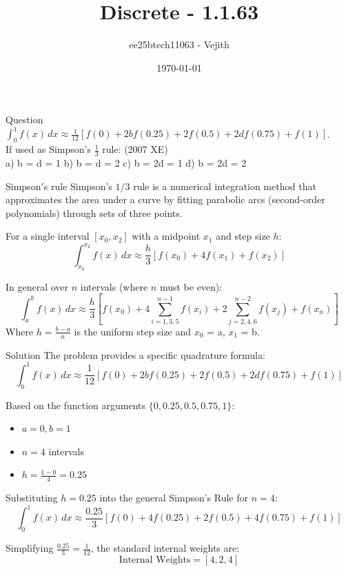 \documentclass{beamer}
\title{Discrete - 1.1.63}
\author{ee25btech11063 - Vejith}
\date{\today}
\begin{document}
\begin{frame}
\titlepage
\end{frame}

\begin{frame}{Question}
 $\int_{0}^{1} f(x) \, dx \approx \frac{1}{12} [f(0) + 2bf(0.25) + 2f(0.5) + 2df(0.75) + f(1)]$. \\
If used as Simpson's $\frac{1}{3}$ rule: \hfill (2007 XE) 
\noindent
\\ a) b = d = 1 \hfill b) b = d = 2 \hfill c) b = 2d = 1 \hfill d) b = 2d = 2
\end{frame}
\begin{frame}{Simpson$'$s rule}
    Simpson's $1/3$ rule is a numerical integration method that approximates the area under a curve by fitting parabolic arcs (second-order polynomials) through sets of three points. 

For a single interval $[x_0, x_2]$ with a midpoint $x_1$ and step size $h$:
\begin{equation}
\int_{x_0}^{x_2} f(x) \, dx \approx \frac{h}{3} \left[ f(x_0) + 4f(x_1) + f(x_2) \right]
\end{equation}

In general  over $n$ intervals (where $n$ must be even):
\begin{equation}
\int_{a}^{b} f(x) \, dx \approx \frac{h}{3} \left[ f(x_0) + 4 \sum_{i=1,3,5}^{n-1} f(x_i) + 2 \sum_{j=2,4,6}^{n-2} f(x_j) + f(x_n) \right]
\end{equation}
Where $h = \frac{b-a}{n}$ is the uniform step size and $x_0$ = a, $x_1$ = b.
\end{frame}
\begin{frame}{Solution}
    The problem provides a specific quadrature formula:
\begin{equation}
\int_{0}^{1} f(x) \, dx \approx \frac{1}{12} \left[ f(0) + 2bf(0.25) + 2f(0.5) + 2df(0.75) + f(1) \right]
\label{eq:given}
\end{equation}

Based on the function arguments $\{0, 0.25, 0.5, 0.75, 1\}$:
\begin{itemize}
    \item $a = 0, b = 1$
    \item $n = 4$ intervals
    \item $h = \frac{1 - 0}{4} = 0.25$
\end{itemize}

Substituting $h = 0.25$ into the general Simpson's Rule for $n=4$:
\begin{equation}
\int_{0}^{1} f(x) \, dx \approx \frac{0.25}{3} \left[ f(0) + 4f(0.25) + 2f(0.5) + 4f(0.75) + f(1) \right]
\end{equation}

Simplifying  $\frac{0.25}{3} = \frac{1}{12}$, the standard internal weights are:
\begin{equation}
\text{Internal Weights} = [4, 2, 4]
\end{equation}
\end{frame}
\end{document}
